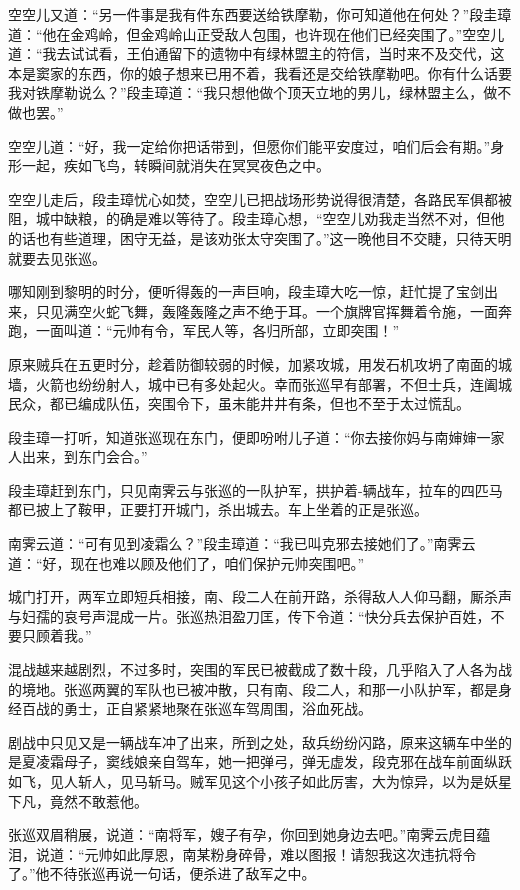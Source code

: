 \documentclass[12pt,oneside]{book}
\begin{document}
空空儿又道：``另一件事是我有件东西要送给铁摩勒，你可知道他在何处？''段圭璋道：``他在金鸡岭，但金鸡岭山正受敌人包围，也许现在他们已经突围了。''空空儿道：``我去试试看，王伯通留下的遗物中有绿林盟主的符信，当时来不及交代，这本是窦家的东西，你的娘子想来已用不着，我看还是交给铁摩勒吧。你有什么话要我对铁摩勒说么？''段圭璋道：``我只想他做个顶天立地的男儿，绿林盟主么，做不做也罢。''

空空儿道：``好，我一定给你把话带到，但愿你们能平安度过，咱们后会有期。''身形一起，疾如飞鸟，转瞬间就消失在冥冥夜色之中。

空空儿走后，段圭璋忧心如焚，空空儿已把战场形势说得很清楚，各路民军俱都被阻，城中缺粮，的确是难以等待了。段圭璋心想，``空空儿劝我走当然不对，但他的话也有些道理，困守无益，是该劝张太守突围了。''这一晚他目不交睫，只待天明就要去见张巡。

哪知刚到黎明的时分，便听得轰的一声巨响，段圭璋大吃一惊，赶忙提了宝剑出来，只见满空火蛇飞舞，轰隆轰隆之声不绝于耳。一个旗牌官挥舞着令施，一面奔跑，一面叫道：``元帅有令，军民人等，各归所部，立即突围！''

原来贼兵在五更时分，趁着防御较弱的时候，加紧攻城，用发石机攻坍了南面的城墙，火箭也纷纷射人，城中已有多处起火。幸而张巡早有部署，不但士兵，连阖城民众，都已编成队伍，突围令下，虽未能井井有条，但也不至于太过慌乱。

段圭璋一打听，知道张巡现在东门，便即吩咐儿子道：``你去接你妈与南婶婶一家人出来，到东门会合。''

段圭璋赶到东门，只见南霁云与张巡的一队护军，拱护着-辆战车，拉车的四匹马都已披上了鞍甲，正要打开城门，杀出城去。车上坐着的正是张巡。

南霁云道：``可有见到凌霜么？''段圭璋道：``我已叫克邪去接她们了。''南霁云道：``好，现在也难以顾及他们了，咱们保护元帅突围吧。''

城门打开，两军立即短兵相接，南、段二人在前开路，杀得敌人人仰马翻，厮杀声与妇孺的哀号声混成一片。张巡热泪盈刀匡，传下令道：``快分兵去保护百姓，不要只顾着我。''

混战越来越剧烈，不过多时，突围的军民已被截成了数十段，几乎陷入了人各为战的境地。张巡两翼的军队也已被冲散，只有南、段二人，和那一小队护军，都是身经百战的勇士，正自紧紧地聚在张巡车驾周围，浴血死战。

剧战中只见又是一辆战车冲了出来，所到之处，敌兵纷纷闪路，原来这辆车中坐的是夏凌霜母子，窦线娘亲自驾车，她一把弹弓，弹无虚发，段克邪在战车前面纵跃如飞，见人斩人，见马斩马。贼军见这个小孩子如此厉害，大为惊异，以为是妖星下凡，竟然不敢惹他。

张巡双眉稍展，说道：``南将军，嫂子有孕，你回到她身边去吧。''南霁云虎目蕴泪，说道：``元帅如此厚恩，南某粉身碎骨，难以图报！请恕我这次违抗将令了。''他不待张巡再说一句话，便杀进了敌军之中。
\end{document}
